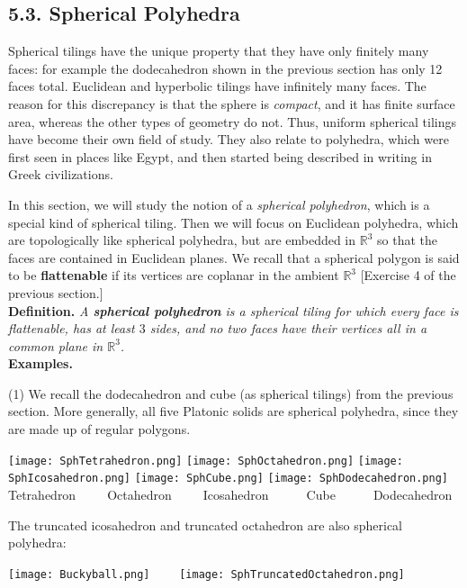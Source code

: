 \documentclass[leqno]{book}
\begin{document}
\subsection*{5.3. Spherical Polyhedra}
Spherical tilings have the unique property that they have only finitely many faces: for example the dodecahedron shown in the previous section has only 12 faces total.  Euclidean and hyperbolic tilings have infinitely many faces.  The reason for this discrepancy is that the sphere is \emph{compact}, and it has finite surface area, whereas the other types of geometry do not.  Thus, uniform spherical tilings have become their own field of study.  They also relate to polyhedra, which were first seen in places like Egypt, and then started being described in writing in Greek civilizations.

In this section, we will study the notion of a \emph{spherical polyhedron}, which is a special kind of spherical tiling.  Then we will focus on Euclidean polyhedra, which are topologically like spherical polyhedra, but are embedded in $\mathbb R^3$ so that the faces are contained in Euclidean planes.  We recall that a spherical polygon is said to be \textbf{flattenable} if its vertices are coplanar in the ambient $\mathbb R^3$ [Exercise 4 of the previous section.]\\

\noindent\textbf{Definition.} \emph{A \textbf{spherical polyhedron} is a spherical tiling for which every face is flattenable, has at least $3$ sides, and no two faces have their vertices all in a common plane in $\mathbb R^3$.}\\

\noindent\textbf{Examples.}

(1) We recall the dodecahedron and cube (as spherical tilings) from the previous section.  More generally, all five Platonic solids are spherical polyhedra, since they are made up of regular polygons.
\begin{center}
\texttt{[image: SphTetrahedron.png]}
\texttt{[image: SphOctahedron.png]}
\texttt{[image: SphIcosahedron.png]}
\texttt{[image: SphCube.png]}
\texttt{[image: SphDodecahedron.png]}\\
Tetrahedron~~~~~Octahedron~~~~~Icosahedron~~~~~~Cube~~~~~~Dodecahedron
\end{center}
The truncated icosahedron and truncated octahedron are also spherical polyhedra:
\begin{center}
\texttt{[image: Buckyball.png]}~~~~
\texttt{[image: SphTruncatedOctahedron.png]}
\end{center}
\end{document}
